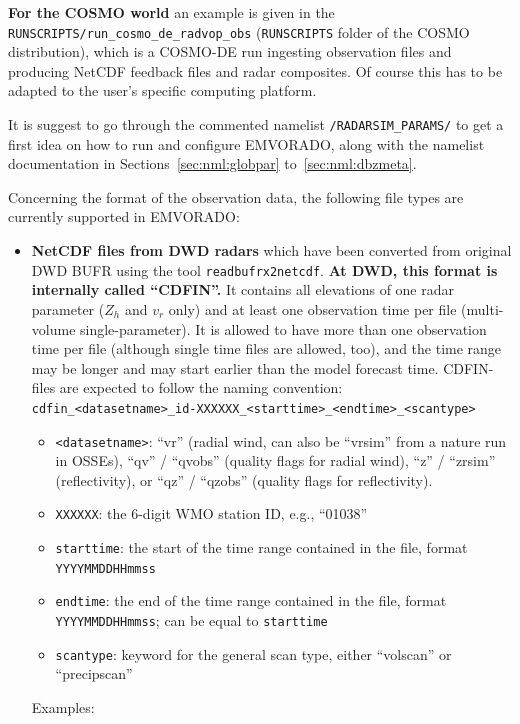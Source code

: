 \documentclass[10pt,a4paper,twoside,headinclude,footinclude,parskip=half]{scrartcl}
\newcommand{\srcform}[1]{\mbox{\texttt{#1}}\xspace}%
\begin{document}
\textbf{For the COSMO world} an example is given in the \srcform{RUNSCRIPTS/run_cosmo_de_radvop_obs} (\srcform{RUNSCRIPTS} folder of the COSMO distribution), which is a COSMO-DE run ingesting
observation files and producing NetCDF feedback files and radar composites. 
Of course this has to be adapted to the user's specific computing platform.

It is suggest to go through the commented namelist \srcform{/RADARSIM_PARAMS/}
to get a first idea on how to run and configure EMVORADO, along with the namelist documentation
in Sections~\ref{sec:nml:globpar} to~\ref{sec:nml:dbzmeta}.

Concerning the format of the observation data, the following
file types are currently supported in EMVORADO:
\begin{itemize}
\item \textbf{NetCDF files from DWD radars} which have been converted from original DWD BUFR using the tool \srcform{readbufrx2netcdf}.
    \textbf{At DWD, this format is internally called ``CDFIN''.} It contains all elevations of one radar parameter ($Z_h$ and $v_r$ only) and at least one
    observation time per file (multi-volume single-parameter). It is
    allowed to have more than one observation time per file (although single time files are allowed, too),
    and the time range may be longer and may start earlier than the model forecast time.
    CDFIN-files are expected to follow the naming convention:\\[0.5em]
    \verb|cdfin_<datasetname>_id-XXXXXX_<starttime>_<endtime>_<scantype>|
    \begin{itemize}
    \item \verb|<datasetname>|: ``vr'' (radial wind, can also be ``vrsim'' from a nature run in OSSEs), ``qv'' / ``qvobs'' (quality flags for radial wind), ``z'' / ``zrsim'' (reflectivity), or ``qz'' / ``qzobs'' (quality flags for reflectivity).
    \item \verb|XXXXXX|: the 6-digit WMO station ID, e.g., ``01038''
    \item \verb|starttime|: the start of the time range contained in the file, format \verb|YYYYMMDDHHmmss|
    \item \verb|endtime|:  the end of the time range contained in the file, format \verb|YYYYMMDDHHmmss|; can be equal to \verb|starttime|
    \item \verb|scantype|: keyword for the general scan type, either ``volscan'' or ``precipscan''
    \end{itemize}
    Examples:

\end{itemize}
\end{document}
